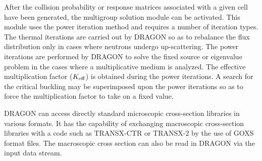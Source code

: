 After the collision probability or response matrices associated with a given
cell have been generated, the multigroup solution module can be activated. This
module uses the power iteration method and  requires a number of iteration
types.\cite{PIM} The thermal iterations are carried out by DRAGON so as to
rebalance the flux distribution only in cases where neutrons undergo
up-scattering. The power iterations are performed by DRAGON to solve the fixed
source or eigenvalue problem in the cases where a multiplicative medium is
analyzed. The effective multiplication factor ($K_{\rm eff}$) is obtained during
the power iterations. A search for the critical buckling may be superimposed
upon the power iterations so as to force the multiplication factor to take on a
fixed value.\cite{Buck}

DRAGON can access directly standard microscopic cross-section libraries in
various formats. It has the capability of
exchanging macroscopic cross-section libraries with a code such as TRANSX-CTR or
TRANSX-2 by the use of GOXS format files.\cite{MATXS,TRANSX2} The macroscopic
cross section can also be read in DRAGON via the input data stream.

